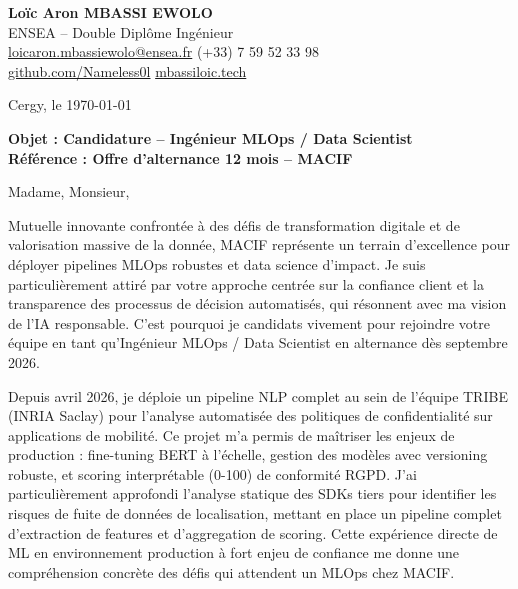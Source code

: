 \documentclass[a4paper,11pt]{article}
\begin{document}
\noindent
\textbf{Lo\"ic Aron MBASSI EWOLO} \\
ENSEA -- Double Dipl\^ome Ing\'enieur \\
\href{mailto:loicaron.mbassiewolo@ensea.fr}{loicaron.mbassiewolo@ensea.fr} \quad (+33) 7 59 52 33 98 \\
\href{https://github.com/Nameless0l}{github.com/Nameless0l} \quad \href{https://mbassiloic.tech}{mbassiloic.tech}

\vspace{1em}
\noindent
Cergy, le \today

\vspace{1em}
\noindent
\textbf{Objet : Candidature -- Ing\'enieur MLOps / Data Scientist} \\
\textbf{R\'ef\'erence : Offre d'alternance 12 mois -- MACIF}

\vspace{1.5em}
\noindent Madame, Monsieur,

\vspace{0.8em}
\noindent Mutuelle innovante confrontée à des défis de transformation digitale et de valorisation massive de la donnée, MACIF représente un terrain d'excellence pour déployer pipelines MLOps robustes et data science d'impact. Je suis particulièrement attiré par votre approche centrée sur la confiance client et la transparence des processus de décision automatisés, qui résonnent avec ma vision de l'IA responsable. C'est pourquoi je candidats vivement pour rejoindre votre équipe en tant qu'Ingénieur MLOps / Data Scientist en alternance dès septembre 2026.

\vspace{0.8em}
\noindent Depuis avril 2026, je déploie un pipeline NLP complet au sein de l'équipe TRIBE (INRIA Saclay) pour l'analyse automatisée des politiques de confidentialité sur applications de mobilité. Ce projet m'a permis de maîtriser les enjeux de production : fine-tuning BERT à l'échelle, gestion des modèles avec versioning robuste, et scoring interprétable (0-100) de conformité RGPD. J'ai particulièrement approfondi l'analyse statique des SDKs tiers pour identifier les risques de fuite de données de localisation, mettant en place un pipeline complet d'extraction de features et d'aggregation de scoring. Cette expérience directe de ML en environnement production à fort enjeu de confiance me donne une compréhension concrète des défis qui attendent un MLOps chez MACIF.
\end{document}
